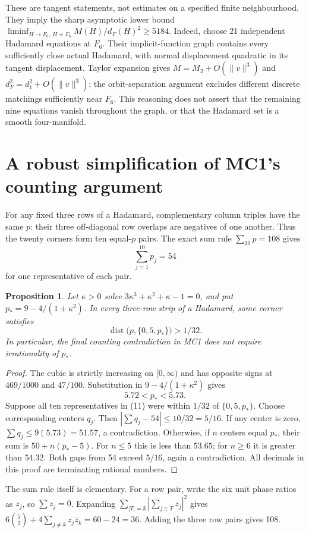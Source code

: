 \documentclass[11pt]{article}
\newtheorem{proposition}[theorem]{Proposition}
\begin{document}
These are tangent statements, not estimates on a specified finite
neighbourhood. They imply the sharp asymptotic lower bound
$\liminf_{H\to F_6,\,H\not\sim F_6} M(H)/d_F(H)^2\ge5184$.
Indeed, choose 21 independent Hadamard equations at $F_6$.
Their implicit-function graph contains every sufficiently close actual
Hadamard, with normal displacement quadratic in its tangent displacement.
Taylor expansion gives $M=M_2+O(\|v\|^3)$ and
$d_F^2=d_1^2+O(\|v\|^3)$; the orbit-separation argument excludes
different discrete matchings sufficiently near $F_6$.
This reasoning does not assert that the remaining nine equations vanish
throughout the graph, or that the Hadamard set is a smooth four-manifold.

\section{A robust simplification of MC1's counting argument}
For any fixed three rows of a Hadamard, complementary column triples have
the same $p$: their three off-diagonal row overlaps are negatives of one
another. Thus the twenty corners form ten equal-$p$ pairs. The exact sum
rule $\sum_{20}p=108$ gives
\[
 \sum_{j=1}^{10}p_j=54 \tag{11}
\]
for one representative of each pair.

\begin{proposition}
Let $\kappa>0$ solve $3\kappa^3+\kappa^2+\kappa-1=0$, and put
$p_*=9-4/(1+\kappa^2)$. In every three-row strip of a Hadamard, some
corner satisfies
\[
 \operatorname{dist}\bigl(p,\{0,5,p_*\}\bigr)>1/32.\tag{12}
\]
In particular, the final counting contradiction in MC1 does not require
irrationality of $p_*$.
\end{proposition}
\begin{proof}
The cubic is strictly increasing on $[0,\infty)$ and has opposite signs
at $469/1000$ and $47/100$. Substitution in $9-4/(1+\kappa^2)$ gives
\[
 5.72<p_*<5.73.\tag{13}
\]
Suppose all ten representatives in (11) were within $1/32$ of
$\{0,5,p_*\}$. Choose corresponding centers $q_j$. Then
$|\sum q_j-54|\le10/32=5/16$.
If any center is zero, $\sum q_j\le9(5.73)=51.57$, a contradiction.
Otherwise, if $n$ centers equal $p_*$, their sum is $50+n(p_*-5)$.
For $n\le5$ this is less than $53.65$; for $n\ge6$ it is greater than
$54.32$. Both gaps from 54 exceed $5/16$, again a contradiction.
All decimals in this proof are terminating rational numbers.
\end{proof}

The sum rule itself is elementary. For a row pair, write the six unit
phase ratios as $z_j$, so $\sum z_j=0$. Expanding
$\sum_{|T|=3}|\sum_{j\in T}z_j|^2$ gives
$6\binom52+4\sum_{j\ne k}z_j\overline z_k=60-24=36$.
Adding the three row pairs gives 108.
\end{document}
